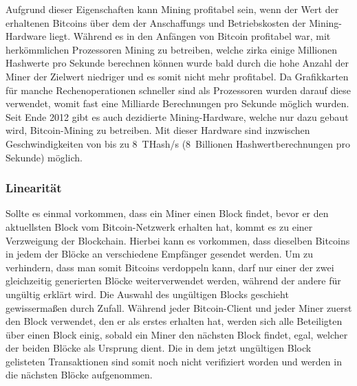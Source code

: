 Aufgrund dieser Eigenschaften kann Mining profitabel sein, wenn der Wert der erhaltenen Bitcoins über dem der Anschaffungs und Betriebskosten der Mining-Hardware liegt.
Während es in den Anfängen von Bitcoin profitabel war, mit herkömmlichen Prozessoren Mining zu betreiben, welche zirka einige Millionen Hashwerte pro Sekunde berechnen können wurde bald durch die hohe Anzahl der Miner der Zielwert niedriger und es somit nicht mehr profitabel.
Da Grafikkarten für manche Rechenoperationen schneller sind als Prozessoren wurden darauf diese verwendet, womit fast eine Milliarde Berechnungen pro Sekunde möglich wurden.
Seit Ende 2012 gibt es auch dezidierte Mining-Hardware, welche nur dazu gebaut wird, Bitcoin-Mining zu betreiben.
Mit dieser Hardware sind inzwischen Geschwindigkeiten von bis zu 8~THash/s (8~Billionen Hashwertberechnungen pro Sekunde) möglich.

\subsubsection{Linearität}

Sollte es einmal vorkommen, dass ein Miner einen Block findet, bevor er den aktuellsten Block vom Bitcoin-Netzwerk erhalten hat, kommt es zu einer Verzweigung der Blockchain.
Hierbei kann es vorkommen, dass dieselben Bitcoins in jedem der Blöcke an verschiedene Empfänger gesendet werden.
Um zu verhindern, dass man somit Bitcoins verdoppeln kann, darf nur einer der zwei gleichzeitig generierten Blöcke weiterverwendet werden, während der andere für ungültig erklärt wird.
Die Auswahl des ungültigen Blocks geschieht gewissermaßen durch Zufall.
Während jeder Bitcoin-Client und jeder Miner zuerst den Block verwendet, den er als erstes erhalten hat, werden sich alle Beteiligten über einen Block einig, sobald ein Miner den nächsten Block findet, egal, welcher der beiden Blöcke als Ursprung dient.
Die in dem jetzt ungültigen Block gelisteten Transaktionen sind somit noch nicht verifiziert worden und werden in die nächsten Blöcke aufgenommen.
